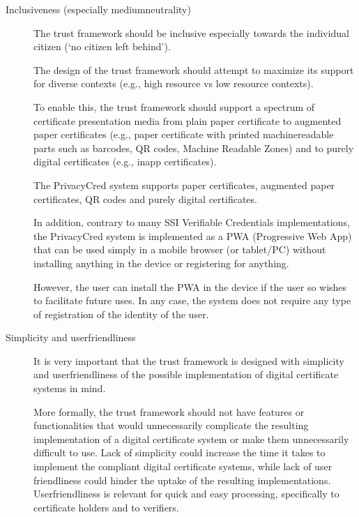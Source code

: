 \documentclass[a4paper,12pt,english,openany]{sphinxmanual}
\begin{document}
\begin{description}
\item[{Inclusiveness (especially medium\sphinxhyphen{}neutrality)}] \leavevmode
\sphinxAtStartPar
The trust framework should be inclusive especially towards the individual citizen (‘no citizen left behind’).

\sphinxAtStartPar
The design of the trust framework should attempt to maximize its support for diverse contexts (e.g., high resource vs low resource contexts).

\sphinxAtStartPar
To enable this, the trust framework should support a spectrum of certificate presentation media from plain paper certificate to augmented paper certificates (e.g., paper certificate with printed machinereadable parts such as barcodes, QR codes, Machine Readable Zones) and to purely digital certificates (e.g., in\sphinxhyphen{}app certificates).

\sphinxAtStartPar
The PrivacyCred system supports paper certificates, augmented paper certificates, QR codes and purely digital certificates.

\sphinxAtStartPar
In addition, contrary to many SSI Verifiable Credentials implementations, the PrivacyCred system is implemented as a PWA (Progressive Web App) that can be used simply in a mobile browser (or tablet/PC) without installing anything in the device or registering for anything.

\sphinxAtStartPar
However, the user can install the PWA in the device if the user so wishes to facilitate future uses. In any case, the system does not require any type of registration of the identity of the user.

\item[{Simplicity and user\sphinxhyphen{}friendliness}] \leavevmode
\sphinxAtStartPar
It is very important that the trust framework is designed with simplicity and user\sphinxhyphen{}friendliness of the possible implementation of digital certificate systems in mind.

\sphinxAtStartPar
More formally, the trust framework should not have features or functionalities that would unnecessarily complicate the resulting implementation of a digital certificate system or make them unnecessarily difficult to use. Lack of simplicity could increase the time it takes to implement the compliant digital certificate systems, while lack of user friendliness could hinder the uptake of the resulting implementations. User\sphinxhyphen{}friendliness is relevant for quick and easy processing, specifically to certificate holders and to verifiers.


\end{description}
\end{document}
